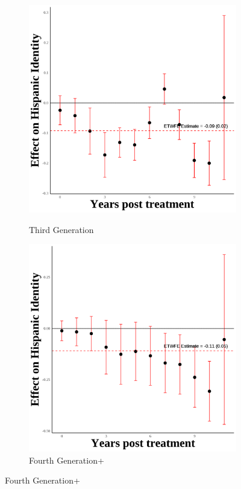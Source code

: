 \documentclass[12pt,english]{article}
\begin{document}
\begin{figure}[H]
  \begin{subfigure}[b]{0.30\textwidth}
    \centering
    \caption{Third Generation}
    \includegraphics[width=\linewidth]{figures/thirdgen-hispanic_event_study.png}
    \label{fig:hispanic-event-study-third}
  \end{subfigure}
  \hfill %
  \begin{subfigure}[b]{0.30\textwidth}
    \centering
    \caption{Fourth Generation+}
    \includegraphics[width=\linewidth]{figures/fourthgen-hispanic_event_study.png}

\end{subfigure}
\end{figure}
\end{document}
